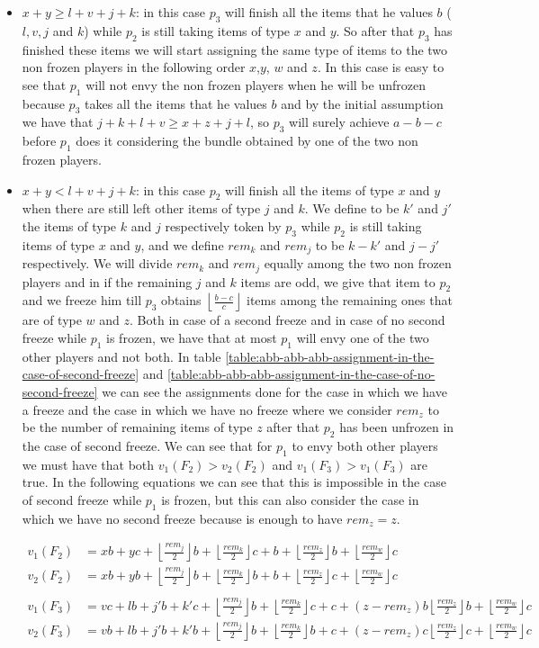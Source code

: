\documentclass{article}
\newcommand{\floor}[3][2]{\left \lfloor\frac{#2}{#3}\right \rfloor}
\begin{document}
\begin{itemize}
    \item $x + y \ge l + v + j + k $: in this case $p_3$ will finish all the items that he values $b$ ($l,v,j$ and $k$) while $p_2$ is still taking items of type $x$ and $y$. So after that $p_3$ has finished these items we will start assigning the same type of items to the two non frozen players in the following order $x$,$y$, $w$ and $z$. In this case is easy to see that $p_1$ will not envy the non frozen players when he will be unfrozen because $p_3$ takes all the items that he values $b$ and by the initial assumption we have that $j + k + l + v \ge x + z + j + l$, so $p_3$ will surely achieve $a-b-c$ before $p_1$ does it considering the bundle obtained by one of the two non frozen players.
    \item $x + y < l + v + j + k $: in this case $p_2$ will finish all the items of type $x$ and $y$ when there are still left other items of type $j$ and $k$. We define to be $k'$ and $j'$ the items of type $k$ and $j$ respectively token by $p_3$ while $p_2$ is still taking items of type $x$ and $y$, and we define $rem_k$ and $rem_j$ to be $k-k'$ and $j-j'$ respectively. We will divide $rem_k$ and $rem_j$ equally among the two non frozen players and in if the remaining $j$ and $k$ items are odd, we give that item to $p_2$ and we freeze him till $p_3$ obtains $\floor{b-c}{c}$ items among the remaining ones that are of type $w$ and $z$. 
    Both in case of a second freeze and in case of no second freeze while $p_1$ is frozen, we have that at most $p_1$ will envy one of the two other players and not both. In table \ref{table:abb-abb-abb-assignment-in-the-case-of-second-freeze} and  \ref{table:abb-abb-abb-assignment-in-the-case-of-no-second-freeze} we can see the assignments done for the case in which we have a freeze and the case in which we have no freeze where we consider $rem_z$ to be the number of remaining items of type $z$ after that $p_2$ has been unfrozen in the case of second freeze.
    We can see that for $p_1$ to envy both other players we must have that both $v_1(F_2) > v_2(F_2)$ and $v_1(F_3) > v_1(F_3)$ are true. In the following equations we can see that this is impossible in the case of second freeze while $p_1$ is frozen, but this can also consider the case in which we have no second freeze because is enough to have $rem_z = z$.
    
    \begin{align*}
        v_1(F_2) &= xb + yc + \floor{rem_j}{2}b + \floor{rem_k}{2}c + b + \floor{rem_z}{2}b + \floor{rem_w}{2}c\\
        v_2(F_2) &= xb + yb + \floor{rem_j}{2}b + \floor{rem_k}{2}b + b + \floor{rem_z}{2}c + \floor{rem_w}{2}c\\
        \\
        v_1(F_3) &= vc + lb + j'b + k'c + \floor{rem_j}{2}b + \floor{rem_k}{2}c + c + (z-rem_z)b \floor{rem_z}{2}b + \floor{rem_w}{2}c\\
        v_2(F_3) &= vb + lb + j'b + k'b + \floor{rem_j}{2}b + \floor{rem_k}{2}b + c + (z-rem_z)c \floor{rem_z}{2}c + \floor{rem_w}{2}c
    \end{align*}
       

\end{itemize}
\end{document}
